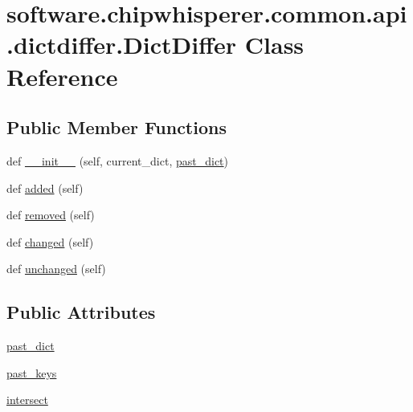 \hypertarget{classsoftware_1_1chipwhisperer_1_1common_1_1api_1_1dictdiffer_1_1DictDiffer}{}\section{software.\+chipwhisperer.\+common.\+api.\+dictdiffer.\+Dict\+Differ Class Reference}
\label{classsoftware_1_1chipwhisperer_1_1common_1_1api_1_1dictdiffer_1_1DictDiffer}
\subsection*{Public Member Functions}
\begin{DoxyCompactItemize}
\item 
def \hyperlink{classsoftware_1_1chipwhisperer_1_1common_1_1api_1_1dictdiffer_1_1DictDiffer_a265e3c9600eff247d3fea7a0df9151f3}{\+\_\+\+\_\+init\+\_\+\+\_\+} (self, current\+\_\+dict, \hyperlink{classsoftware_1_1chipwhisperer_1_1common_1_1api_1_1dictdiffer_1_1DictDiffer_a5ea256bc3eaea57ca7b5c0fedafa7f26}{past\+\_\+dict})
\item 
def \hyperlink{classsoftware_1_1chipwhisperer_1_1common_1_1api_1_1dictdiffer_1_1DictDiffer_ac67c82bc75806255fc4f35fdff530cbf}{added} (self)
\item 
def \hyperlink{classsoftware_1_1chipwhisperer_1_1common_1_1api_1_1dictdiffer_1_1DictDiffer_a84b5decc8cae9d5a3fa3b3f2446580c1}{removed} (self)
\item 
def \hyperlink{classsoftware_1_1chipwhisperer_1_1common_1_1api_1_1dictdiffer_1_1DictDiffer_a1334c74760fb631734a01557b39f9b8c}{changed} (self)
\item 
def \hyperlink{classsoftware_1_1chipwhisperer_1_1common_1_1api_1_1dictdiffer_1_1DictDiffer_a40986c4add584a4d2ef51cc564f7ab4c}{unchanged} (self)
\end{DoxyCompactItemize}
\subsection*{Public Attributes}
\begin{DoxyCompactItemize}
\item 
\hyperlink{classsoftware_1_1chipwhisperer_1_1common_1_1api_1_1dictdiffer_1_1DictDiffer_a5ea256bc3eaea57ca7b5c0fedafa7f26}{past\+\_\+dict}
\item 
\hyperlink{classsoftware_1_1chipwhisperer_1_1common_1_1api_1_1dictdiffer_1_1DictDiffer_a02ddc9b7c09c5cad76b4fa4e6c7572e3}{past\+\_\+keys}
\item 
\hyperlink{classsoftware_1_1chipwhisperer_1_1common_1_1api_1_1dictdiffer_1_1DictDiffer_a6b8cde04fc1f5bc7aa9339ed42fb2a29}{intersect}
\end{DoxyCompactItemize}


